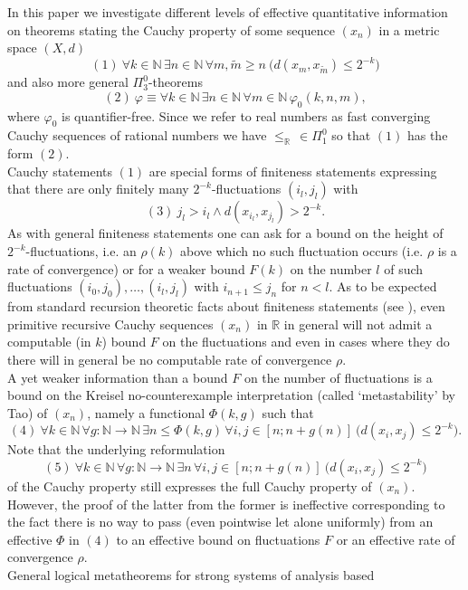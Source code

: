 \documentclass[1p]{elsarticle}
\newcommand{\RR}{\ensuremath{\mathbb{R}}}
\newcommand{\NN}{\ensuremath{\mathbb{N}}}
\theoremstyle{plain}
\theoremstyle{definition}
\theoremstyle{remark}
\theoremstyle{definition}
\begin{document}
In this paper we investigate different levels of effective quantitative 
information on theorems stating the Cauchy property of some sequence 
$(x_n)$ in a metric space $(X,d)$
\[ (1) \ \forall k\in\NN\,\exists n\in\NN\,\forall m,\tilde{m}\ge n
\ \big( d(x_m,
x_{\tilde{m}})\le 2^{-k}\big) \] 
and also more general $\Pi^0_3$-theorems  
\[ (2) \ \varphi\equiv 
\forall k\in\NN\,\exists n\in\NN\,
\forall m\in\NN\,\varphi_0(k,n,m),\] where $\varphi_0$ is quantifier-free. 
Since we refer to real numbers as fast 
converging Cauchy sequences of rational numbers we have $\le_{\RR}\,\in\Pi^0_1$ 
so that $(1)$ has the form $(2).$
\\[2mm] 
Cauchy statements $(1)$ are special forms of finiteness statements expressing 
that there are only finitely many $2^{-k}$-fluctuations $(i_l,j_l)$ 
with 
\[ (3) \ j_l>i_l\wedge d(x_{i_l},x_{j_l})>2^{-k}. \] 
As with general finiteness statements one can ask for a bound on the height 
of $2^{-k}$-fluctuations, i.e. an $\rho(k)$ above which no such fluctuation 
occurs (i.e. $\rho$ is a rate of convergence) 
or for a weaker bound $F(k)$ on the number $l$ 
of such fluctuations $(i_0,j_0),\ldots,(i_l,j_l)$ with $i_{n+1}\le j_{n}$ 
for $n<l.$ 
As to be expected from standard recursion theoretic facts about finiteness 
statements (see \cite{Luckhardt(89)}), even primitive recursive Cauchy sequences $(x_n)$ in $\RR$ 
in general will not admit a computable (in $k$) bound $F$ on the fluctuations 
and even in cases where they do there will in general be no computable 
rate of convergence $\rho.$\\[2mm] 
A yet weaker information than a bound $F$ on the number of fluctuations is 
a bound on the Kreisel no-counterexample 
interpretation (called `metastability' by Tao) of $(x_n)$, namely a functional 
$\Phi(k,g)$ such that 
\[ (4) \ \forall k\in\NN\,\forall g:\NN\to\NN\, \exists n\le \Phi(k,g) 
\,\forall i,j \in [n;n+g(n)]\ \big( d(x_i,x_j)\le 2^{-k}\big). \]
Note that the underlying reformulation 
\[ (5) \ \forall k\in \NN\,\forall g:\NN\to\NN\, \exists n
\,\forall i,j \in [n;n+g(n)]\ \big( d(x_i,x_j)\le 2^{-k}\big) \]
of the Cauchy property 
still expresses the full Cauchy property of $(x_n).$ However, the proof 
of the latter from the former is ineffective corresponding to the fact 
there is no way to 
pass (even pointwise let alone uniformly) 
from an effective $\Phi$ in $(4)$ to an 
effective bound on fluctuations $F$ or an effective rate of convergence $\rho.$
\\[2mm] General logical metatheorems for strong systems of analysis based 
\end{document}
